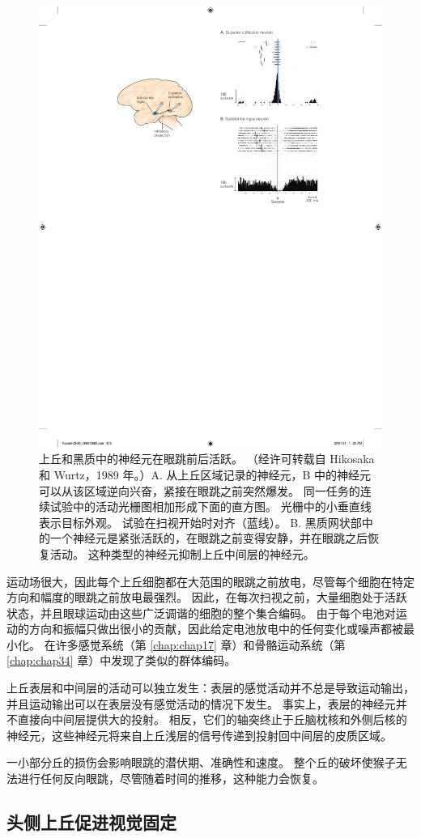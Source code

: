\begin{figure}[htbp]
	\centering
	\includegraphics[width=0.5\linewidth]{chap35/fig_35_11}
	\caption{上丘和黑质中的神经元在眼跳前后活跃。 （经许可转载自 Hikosaka 和 Wurtz，1989 年。）A. 从上丘区域记录的神经元，B 中的神经元可以从该区域逆向兴奋，紧接在眼跳之前突然爆发。 同一任务的连续试验中的活动光栅图相加形成下面的直方图。 光栅中的小垂直线表示目标外观。 试验在扫视开始时对齐（蓝线）。 B. 黑质网状部中的一个神经元是紧张活跃的，在眼跳之前变得安静，并在眼跳之后恢复活动。 这种类型的神经元抑制上丘中间层的神经元。}
	\label{fig:35_11}
\end{figure}


运动场很大，因此每个上丘细胞都在大范围的眼跳之前放电，尽管每个细胞在特定方向和幅度的眼跳之前放电最强烈。
因此，在每次扫视之前，大量细胞处于活跃状态，并且眼球运动由这些广泛调谐的细胞的整个集合编码。
由于每个电池对运动的方向和振幅只做出很小的贡献，因此给定电池放电中的任何变化或噪声都被最小化。
在许多感觉系统（第 \ref{chap:chap17} 章）和骨骼运动系统（第 \ref{chap:chap34} 章）中发现了类似的群体编码。


上丘表层和中间层的活动可以独立发生：表层的感觉活动并不总是导致运动输出，并且运动输出可以在表层没有感觉活动的情况下发生。
事实上，表层的神经元并不直接向中间层提供大的投射。 相反，它们的轴突终止于丘脑枕核和外侧后核的神经元，这些神经元将来自上丘浅层的信号传递到投射回中间层的皮质区域。


一小部分丘的损伤会影响眼跳的潜伏期、准确性和速度。
整个丘的破坏使猴子无法进行任何反向眼跳，尽管随着时间的推移，这种能力会恢复。


\subsection{头侧上丘促进视觉固定}

